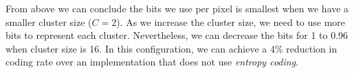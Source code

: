 \documentclass[]{../ncmathy}
\begin{document}
	From above we can conclude the bits we use per pixel is smallest when we have a smaller cluster size ($C=2$). As we increase the cluster size, we need to use more bits to represent each cluster. Nevertheless, we can decrease the bits for 1 to 0.96 when cluster size is 16. In this configuration, we can achieve a 4\% reduction in coding rate over an implementation that does not use \textit{entropy coding}.
	
\end{document}
